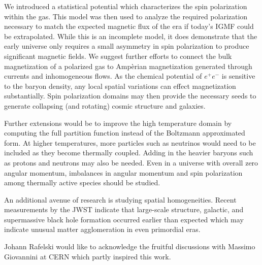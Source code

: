 \documentclass[reprint]{revtex4-2}
\begin{document}
We introduced a statistical potential which characterizes the spin polarization within the gas. This model was then used to analyze the required polarization necessary to match the expected magnetic flux of the era if today's IGMF could be extrapolated. While this is an incomplete model, it does demonstrate that the early universe only requires a small asymmetry in spin polarization to produce significant magnetic fields. We suggest further efforts to connect the bulk magnetization of a polarized gas to Amp{\`e}rian magnetization generated through currents and inhomogeneous flows. As the chemical potential of $e^{+}e^{-}$ is sensitive to the baryon density, any local spatial variations can effect magnetization substantially. Spin polarization domains may then provide the necessary seeds to generate collapsing (and rotating) cosmic structure and galaxies.

Further extensions would be to improve the high temperature domain by computing the full partition function instead of the Boltzmann approximated form. At higher temperatures, more particles such as neutrinos would need to be included as they become thermally coupled. Adding in the heavier baryons such as protons and neutrons may also be needed. Even in a universe with overall zero angular momentum, imbalances in angular momentum and spin polarization among thermally active species should be studied. 

An additional avenue of research is studying spatial homogeneities. Recent measurements by the JWST indicate that large-scale structure, galactic, and supermassive black hole formation occurred earlier than expected which may indicate unusual matter agglomeration in even primordial eras.

\acknowledgements
\label{sec:ack}
\noindent Johann Rafelski would like to acknowledge the fruitful discussions with Massimo Giovannini at CERN which partly inspired this work.



\end{document}
